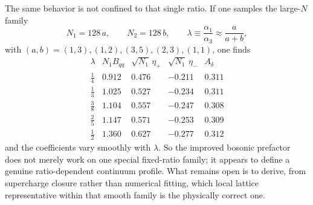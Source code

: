 \documentclass[11pt]{article}
\numberwithin{equation}{section}
\begin{document}
The same behavior is not confined to that single ratio. If one samples the large-$N$ family
\begin{equation}
\label{eq:s15-1-030}
N_1=128\,a,
\qquad
N_2=128\,b,
\qquad
\lambda\equiv \frac{\alpha_1}{\alpha_3}\approx \frac{a}{a+b},
\end{equation}
with $(a,b)=(1,3),(1,2),(3,5),(2,3),(1,1)$, one finds
\begin{equation}
\label{eq:s15-1-031}
\begin{array}{c|cccc}
\lambda & N_1B_{qq} & \sqrt{N_1}\,\eta_+ & \sqrt{N_1}\,\eta_- & A_\delta\\
\hline
\frac14 & 0.912 & 0.476 & -0.211 & 0.311\\
\frac13 & 1.025 & 0.527 & -0.234 & 0.311\\
\frac38 & 1.104 & 0.557 & -0.247 & 0.308\\
\frac25 & 1.147 & 0.571 & -0.253 & 0.309\\
\frac12 & 1.360 & 0.627 & -0.277 & 0.312
\end{array}
\end{equation}
and the coefficients vary smoothly with $\lambda$. So the improved bosonic prefactor does not merely work on one special fixed-ratio family; it appears to define a genuine ratio-dependent continuum profile. What remains open is to derive, from supercharge closure rather than numerical fitting, which local lattice representative within that smooth family is the physically correct one.
\end{document}
